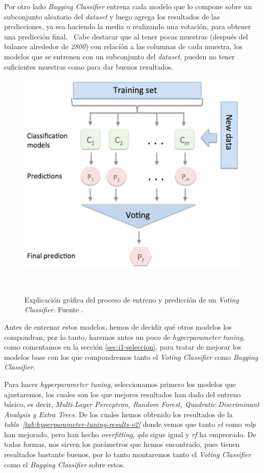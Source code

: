 Por otro lado \textit{Bagging Classifier} entrena cada modelo que lo compone sobre un subconjunto aleatorio del \textit{dataset} y luego agrega los resultados de las predicciones, ya sea haciendo la media o realizando una votación, para obtener una predicción final.\ \cite{sklearne53:online} Cabe destacar que al tener pocas muestras (después del balance alrededor de \textit{2800}) con relación a las columnas de cada muestra, los modelos que se entrenen con un subconjunto del \textit{dataset}, pueden no tener suficientes muestras como para dar buenos resultados.

\begin{figure}[!h]
    \centering
    \includegraphics[width=0.7\linewidth]{media/images/majority_voting.png}
    \caption{Explicación gráfica del proceso de entreno y predicción de un \textit{Voting Classifier}. Fuente \cite{Ensemble96:online}.}\ \label{fig:voting-classifiers}
\end{figure}

Antes de entrenar estos modelos, hemos de decidir qué otros modelos los compondran, por lo tanto, haremos antes un poco de \textit{hyperparameter tuning}, como comentamos en la sección \ref{sec:i1-seleccion}, para tratar de mejorar los modelos base con los que compondremos tanto el \textit{Voting Classifier} como \textit{Bagging Classifier}.


Para hacer \textit{hyperparameter tuning}, seleccionamos primero los modelos que ajustaremos, los cuales son los que mejores resultados han dado del entreno básico, es decir, \textit{Multi-Layer Perceptron, Random Forest, Quadratic Discriminant Analysis y Extra Trees}. De los cuales hemos obtenido los resultados de la \textit{tabla\ \ref{tab:hyperparameter-tuning-results-v2}} donde vemos que tanto \textit{et} como \textit{mlp} han mejorado, pero han hecho \textit{overfitting}, \textit{qda} sigue igual y \textit{rf} ha empeorado. De todas formas, nos sirven los parámetros que hemos encontrado, pues tienen resultados bastante buenos, por lo tanto montaremos tanto el \textit{Voting Classifier} como el \textit{Bagging Classifier} sobre estos.


